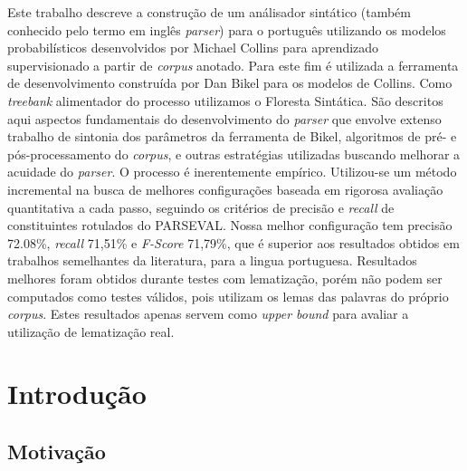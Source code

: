 \documentclass[a4paper]{abnt}
\begin{document}


\pagestyle{plain}


\begin{resumo}
Este trabalho descreve a construção de um análisador sintático (também conhecido pelo termo em inglês \emph{parser}) para o português utilizando os modelos probabilísticos desenvolvidos por Michael Collins para aprendizado supervisionado a partir de \emph{corpus} anotado. 
Para este fim é utilizada a ferramenta de desenvolvimento construída por Dan Bikel para os modelos de Collins. 
Como \emph{treebank} alimentador do processo utilizamos o Floresta Sintática.
São descritos aqui aspectos fundamentais do desenvolvimento do \emph{parser} que envolve extenso trabalho de sintonia dos parâmetros da ferramenta de Bikel, algoritmos de pré- e pós-processamento do \emph{corpus}, e outras estratégias utilizadas buscando melhorar a acuidade do \emph{parser}. 
O processo é inerentemente empírico. Utilizou-se um método incremental na busca de melhores configurações baseada em rigorosa avaliação quantitativa a cada passo, seguindo os critérios de precisão e \emph{recall} de constituintes rotulados do PARSEVAL. 
Nossa melhor configuração tem precisão 72.08{\%}, \emph{recall} 71,51{\%} e \emph{F-Score} 71,79{\%}, que é superior aos resultados obtidos em trabalhos semelhantes da literatura, para a lingua portuguesa. Resultados melhores foram obtidos durante testes com lematização, porém não podem ser computados como testes válidos, pois utilizam os lemas das palavras do próprio \emph{corpus}. Estes resultados apenas servem como \emph{upper bound} para avaliar a utilização de lematização real.

\end{resumo}

\tableofcontents
\listoffigures
\listoftables

%


\setcounter{page}{0}

\chapter{Introdução}
\label{cha:introducao}
\thispagestyle{empty}
    

\section{Motivação}
\label{sec:motivacao}
	
\end{document}
